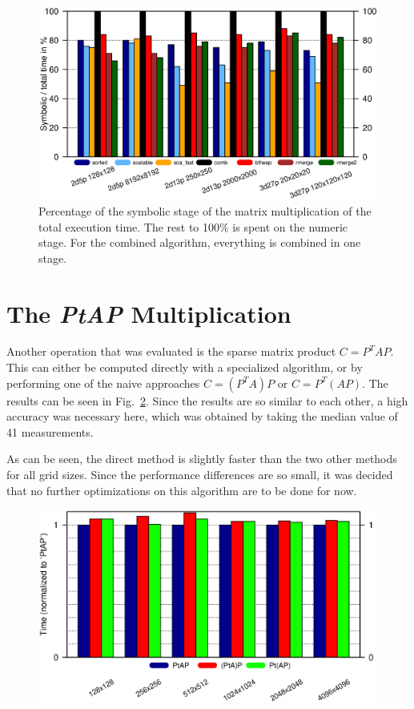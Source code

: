 \begin{figure}[tbp]
	\centering
	\includegraphics[width=1.05\textwidth, trim={0 2.cm 0 6cm},clip]{seq_symnum}
	\caption{Percentage of the symbolic stage of the matrix multiplication of the total execution time. The rest to 100\% is spent on the numeric stage. For the combined algorithm, everything is combined in one stage.} 
	\label{fig:seqsymnum}
\end{figure}


\section{The \textit{PtAP} Multiplication}
Another operation that was evaluated is the sparse matrix product $C = P^T A P$. This can either be computed directly with a specialized algorithm, or by performing one of the naive approaches $C = (P^T A) P$ or $C = P^T (A P)$. The results can be seen in Fig.~\ref{fig:ex2_ptap}. Since the results are so similar to each other, a high accuracy was necessary here, which was obtained by taking the median value of 41 measurements.

As can be seen, the direct method is slightly faster than the two other methods for all grid sizes. 	Since the performance differences are so small, it was decided that no further optimizations on this algorithm are to be done for now.

\begin{figure}[tbp]
	\centering
	\includegraphics[width=0.99\textwidth,  trim={0 2.cm 0 6cm},clip]{ex2_PtAP}
	\caption{} 
	\label{fig:ex2_ptap}
\end{figure}

